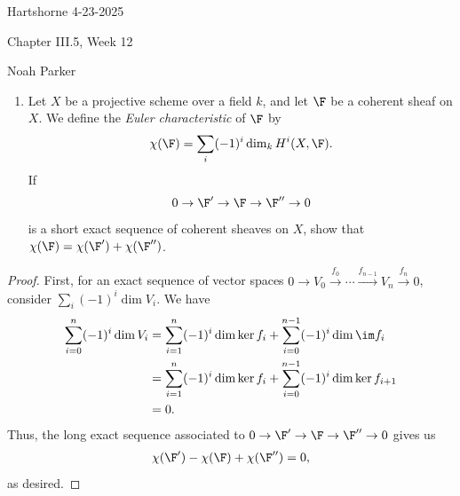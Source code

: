 \documentclass[12pt]{amsart}
\begin{document}
{Hartshorne} \hfill {4-23-2025}

\bigskip\bigskip

\begin{center}

{\sc Chapter III.5, Week 12}

\end{center}

\begin{center}

  {Noah Parker} 
    
\end{center}

\bigskip\bigskip

\begin{enumerate}
  \item[5.1.] {
      Let $X$ be a projective scheme over a field $k$, and let $\F$ be a coherent sheaf on $X$.
      We define the \emph{Euler characteristic} of $\F$ by
      \[
        \chi(\F)=\sum_i(-1)^i\dim_kH^i(X,\F).
      \] 
      If
      \[
        0\to \F'\to \F\to \F''\to 0
      \] 
      is a short exact sequence of coherent sheaves on $X$, show that $\chi(\F)=\chi(\F')+\chi(\F'')$.
    }
\end{enumerate}

\begin{proof}
  First, for an exact sequence of vector spaces $0\to V_0\xrightarrow{f_0}\cdots\xrightarrow{f_{n-1}} V_n\xrightarrow{f_n}0$, consider $\sum_i(-1)^i\dim V_i$.
  We have 
  \begin{align*}
    \sum_{i=0}^n(-1)^i\dim V_i 
    &= \sum_{i=1}^n(-1)^i\dim \ker f_i +\sum_{i=0}^{n-1}(-1)^i\dim \im f_i \\
    &= \sum_{i=1}^n(-1)^i \dim \ker f_i +\sum_{i=0}^{n-1} (-1)^i\dim\ker f_{i+1} \\
    &=0.
  \end{align*}
  Thus, the long exact sequence associated to $0\to \F'\to \F\to \F''\to 0$ gives us
  \begin{align*}
    \chi(\F')-\chi(\F)+\chi(\F'')= 0,
  \end{align*}
  as desired.
\end{proof}
\end{document}
